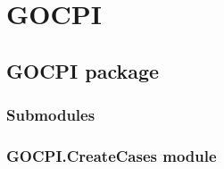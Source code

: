 \documentclass[a4paper,12pt,english]{article}
\begin{document}
        \clearpage
        \tableofcontents
        \listoffigures
        \listoftables
        \clearpage

        
\pagestyle{plain}
 
\pagestyle{normal}
\label{\detokenize{index::doc}}



\chapter{GOCPI}
\label{\detokenize{modules:gocpi}}\label{\detokenize{modules::doc}}

\section{GOCPI package}
\label{\detokenize{GOCPI:gocpi-package}}\label{\detokenize{GOCPI::doc}}

\subsection{Submodules}
\label{\detokenize{GOCPI:submodules}}

\subsection{GOCPI.CreateCases module}
\label{\detokenize{GOCPI:module-GOCPI.CreateCases}}\label{\detokenize{GOCPI:gocpi-createcases-module}}
\end{document}
